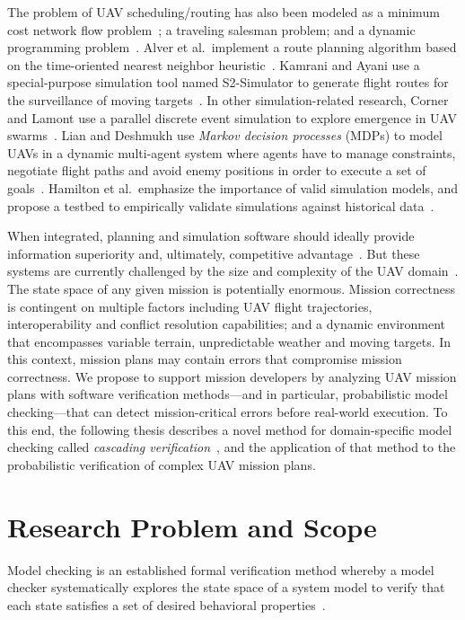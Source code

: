The problem of UAV scheduling/routing has also been modeled as a minimum cost network flow problem~\cite{Shetty_2008}; a traveling salesman problem; and a dynamic programming problem~\cite{Ahner_2006}. Alver et al.\ implement a route planning algorithm based on the time-oriented nearest neighbor heuristic~\cite{Alver_2012}. Kamrani and Ayani use a special-purpose simulation tool named S2-Simulator to generate flight routes for the surveillance of moving targets~\cite{Kamrani_2007}. In other simulation-related research, Corner and Lamont use a parallel discrete event simulation to explore emergence in UAV swarms~\cite{Corner_2004}. Lian and Deshmukh use \emph{Markov decision processes} (MDPs) to model UAVs in a dynamic multi-agent system where agents have to manage constraints, negotiate flight paths and avoid enemy positions in order to execute a set of goals~\cite{Lian_2006}. Hamilton et al.\ emphasize the importance of valid simulation models, and propose a testbed to empirically validate simulations against historical data~\cite{Hamilton_2007}.

When integrated, planning and simulation software should ideally provide information superiority and, ultimately, competitive advantage~\cite{Cebrowski_1998}. But these systems are currently challenged by the size and complexity of the UAV domain~\cite{Chasparis_2005,Jang_2005,Russo_2006}. The state space of any given mission is potentially enormous. Mission correctness is contingent on multiple factors including UAV flight trajectories, interoperability and conflict resolution capabilities; and a dynamic environment that encompasses variable terrain, unpredictable weather and moving targets. In this context, mission plans may contain errors that compromise mission correctness. We propose to support mission developers by analyzing UAV mission plans with software verification methods---and in particular, probabilistic model checking---that can detect mission-critical errors before real-world execution. To this end, the following thesis describes a novel method for domain-specific model checking called \emph{cascading verification}~\cite{Zervoudakis_2013}, and the application of that method to the probabilistic verification of complex UAV mission plans.

\section{Research Problem and Scope}
\label{sec:Research_Problem_and_Scope}

Model checking is an established formal verification method whereby a model checker systematically explores the state space of a system model to verify that each state satisfies a set of desired behavioral properties~\cite{Baier_2008}.

